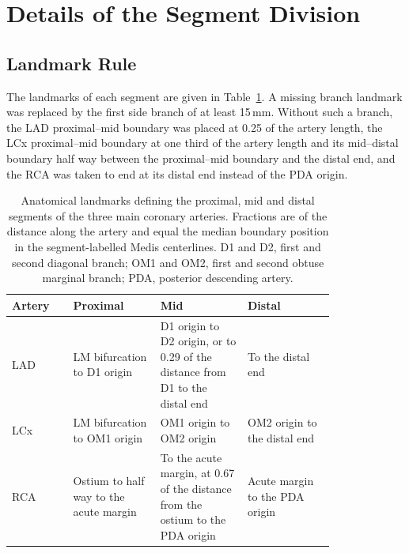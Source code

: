 \section{Details of the Segment Division}
\label{sec:app-split}

\subsection{Landmark Rule}
\label{sec:app-split-rule}

The landmarks of each segment are given in Table~\ref{tab:method-segments}.
A missing branch landmark was replaced by the first side branch of at least 15\,mm.
Without such a branch, the LAD proximal--mid boundary was placed at 0.25 of the artery length, the LCx proximal--mid boundary at one third of the artery length and its mid--distal boundary half way between the proximal--mid boundary and the distal end, and the RCA was taken to end at its distal end instead of the PDA origin.

\begin{table}[htbp]
  \centering
  \caption{Anatomical landmarks defining the proximal, mid and distal segments of the three main coronary arteries. Fractions are of the distance along the artery and equal the median boundary position in the segment-labelled Medis centerlines. D1 and D2, first and second diagonal branch; OM1 and OM2, first and second obtuse marginal branch; PDA, posterior descending artery.}
  \label{tab:method-segments}
  \small
  \begin{tabular}{lp{0.27\linewidth}p{0.27\linewidth}p{0.27\linewidth}}
    \toprule
    Artery & Proximal & Mid & Distal \\
    \midrule
    LAD & LM bifurcation to D1 origin & D1 origin to D2 origin, or to 0.29 of the distance from D1 to the distal end & To the distal end \\
    LCx & LM bifurcation to OM1 origin & OM1 origin to OM2 origin & OM2 origin to the distal end \\
    RCA & Ostium to half way to the acute margin & To the acute margin, at 0.67 of the distance from the ostium to the PDA origin & Acute margin to the PDA origin \\
    \bottomrule
  \end{tabular}
\end{table}

